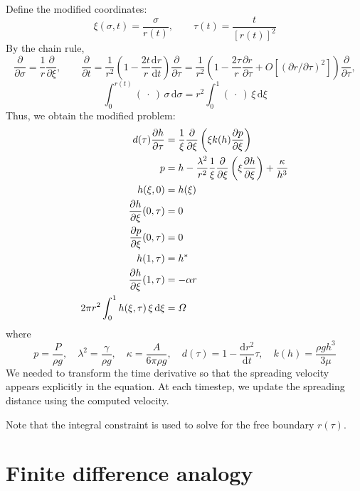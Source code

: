 \documentclass[12pt]{article}
\numberwithin{equation}{section}
\begin{document}
 Define the modified coordinates:
 \[
 	\xi(\sigma, t) = \frac{\sigma}{r(t)}
 	,\qquad
 	\tau (t)
 	=
 	\frac{t}{[r(t)]^2}
  \] 
By the chain rule,
\[
	\frac{\partial}{\partial \sigma} = \frac{1}{r} \frac{\partial}{\partial \xi},
	\qquad
	\frac{\partial}{\partial t} 
	= \frac{1}{r^2} \left( 1 - \frac{2t}{r} \frac{\mathrm{d}r}{\mathrm{d}t} \right) \frac{\partial}{\partial \tau}
	= \frac{1}{r^2} \left( 1 - \frac{2\tau}{r} \frac{\partial r}{\partial \tau} + O[( {\partial r}/{\partial \tau})^2] \right) \frac{\partial}{\partial \tau},
\]
\[
	\int_0^{r(t)} ( ~\cdot ~) \, \sigma \, \mathrm{d}\sigma = r^2 \int_0^1 ( ~ \cdot ~) \, \xi \, \mathrm{d}\xi
\]
Thus, we obtain the modified problem:
\begin{align}
	d(\tau)\frac{\partial h}{\partial \tau} &= \frac{1}{\xi} \frac{\partial }{\partial \xi}  \left( \xi k(h) \frac{\partial p}{\partial \xi} \right)
	\\
	p &
	= h - \frac{\lambda^2}{r^2} \frac{1}{\xi}\frac{\partial }{\partial \xi} \left( \xi \frac{\partial h}{\partial \xi} \right) 
	+ \frac{\kappa}{h^3}
	\\
	h(\xi,0) &= h(\xi)
	\\
	\frac{\partial h}{\partial \xi} (0,\tau) &= 0
	\\
	\frac{\partial p}{\partial \xi}(0,\tau) &=0
	\\
	h(1,\tau) &= h^*
	\\
	\frac{\partial h}{\partial \xi}(1,\tau) &= - \alpha r
	\\
	2 \pi r^2 \int_0^{1} h(\xi,\tau) \, \xi \, \mathrm{d}\xi &= \mit{\Omega}
\end{align}
where
\[
	p = 
	\frac{P}{\rho g}, \quad
	\lambda^2 = \frac{\gamma}{\rho g},\quad
	\kappa = \frac{A}{6 \pi \rho g},
	\quad
	d(\tau)  = 1 - \frac{\mathrm{d}r^2}{\mathrm{d}t}\tau, \quad
	k(h) = \frac{\rho g h^3}{3\mu}
\]
We needed to transform the time derivative so that the spreading velocity appears explicitly in the equation. At each timestep, we update the spreading distance using the computed velocity.

Note that the integral constraint is used to solve for the free boundary $r(\tau)$.

\section{Finite difference analogy}
\end{document}
